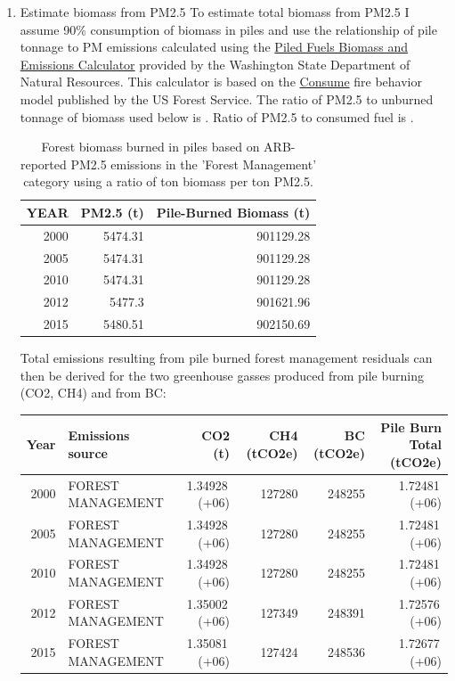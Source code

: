 \documentclass[a4paper]{article}
\begin{document}
\begin{enumerate}
\item Estimate biomass from PM2.5
\label{sec-1-3-3-1}
To estimate total biomass from PM2.5 I assume 90\% consumption of biomass in piles and use the relationship of pile tonnage to PM emissions calculated using the \href{http://depts.washington.edu/nwfire/piles/}{Piled Fuels Biomass and Emissions Calculator} provided by the Washington State Department of Natural Resources. This calculator is based on the \href{http://www.fs.fed.us/pnw/fera/research/smoke/consume/index.shtml}{Consume} fire behavior model published by the US Forest Service. The ratio of PM2.5 to unburned tonnage of biomass used below is . Ratio of PM2.5 to consumed fuel is .


\begin{table}[htb]
\caption{Forest biomass burned in piles based on ARB-reported PM2.5 emissions in the 'Forest Management' category using a ratio of ton biomass per ton PM2.5.}
\centering
\begin{tabular}{rrr}
YEAR & PM2.5 (t) & Pile-Burned Biomass (t)\\
\hline
2000 & 5474.31 & 901129.28\\
2005 & 5474.31 & 901129.28\\
2010 & 5474.31 & 901129.28\\
2012 & 5477.3 & 901621.96\\
2015 & 5480.51 & 902150.69\\
\end{tabular}
\end{table}

Total emissions resulting from pile burned forest management residuals
can then be derived for the two greenhouse gasses produced from pile
burning (CO2, CH4) and from BC:

\begin{center}
\begin{tabular}{rlrrrr}
Year & Emissions source & CO2 (t) & CH4 (tCO2e) & BC (tCO2e) & Pile Burn Total (tCO2e)\\
\hline
2000 & FOREST MANAGEMENT & 1.34928\,(+06) & 127280 & 248255 & 1.72481\,(+06)\\
2005 & FOREST MANAGEMENT & 1.34928\,(+06) & 127280 & 248255 & 1.72481\,(+06)\\
2010 & FOREST MANAGEMENT & 1.34928\,(+06) & 127280 & 248255 & 1.72481\,(+06)\\
2012 & FOREST MANAGEMENT & 1.35002\,(+06) & 127349 & 248391 & 1.72576\,(+06)\\
2015 & FOREST MANAGEMENT & 1.35081\,(+06) & 127424 & 248536 & 1.72677\,(+06)\\
\end{tabular}
\end{center}



\end{enumerate}
\end{document}
